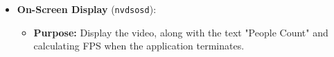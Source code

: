\begin{itemize}
\begin{itemize}
            \item \textbf{Purpose: }Executes the custom TensorRT people counting model on the frames received from \verb|nvstreammux|.
            \item \textbf{Output: }Passes through the video frame, along with the calculation result. The probe then finds the "number\_of\_people" output layer, extracts the count, and prepares for \verb|nvdsosd|.
        \end{itemize}
    \item \textbf{On-Screen Display} (\verb|nvdsosd|):
        \begin{itemize}
            \item \textbf{Purpose: }Display the video, along with the text "People Count" and calculating FPS when the application terminates.
        \end{itemize}
\end{itemize}